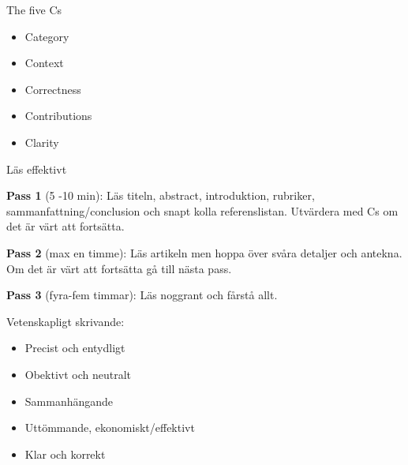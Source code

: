 The five Cs
\begin{itemize}
\item Category
\item Context
\item Correctness
\item Contributions
\item Clarity
\end{itemize}

Läs effektivt

\textbf{Pass 1} (5 -10 min): Läs titeln, abstract, introduktion, rubriker, sammanfattning/conclusion och snapt kolla referenslistan. Utvärdera med Cs om det är värt att fortsätta.

\textbf{Pass 2} (max en timme): Läs artikeln men hoppa över svåra detaljer och antekna. Om det är värt att fortsätta gå till nästa pass.

\textbf{Pass 3} (fyra-fem timmar): Läs noggrant och fårstå allt.

Vetenskapligt skrivande:
\begin{itemize}
\item Precist och entydligt
\item Obektivt och neutralt
\item Sammanhängande
\item Uttömmande, ekonomiskt/effektivt
\item Klar och korrekt
\end{itemize}
  
%
%
%
%
%

